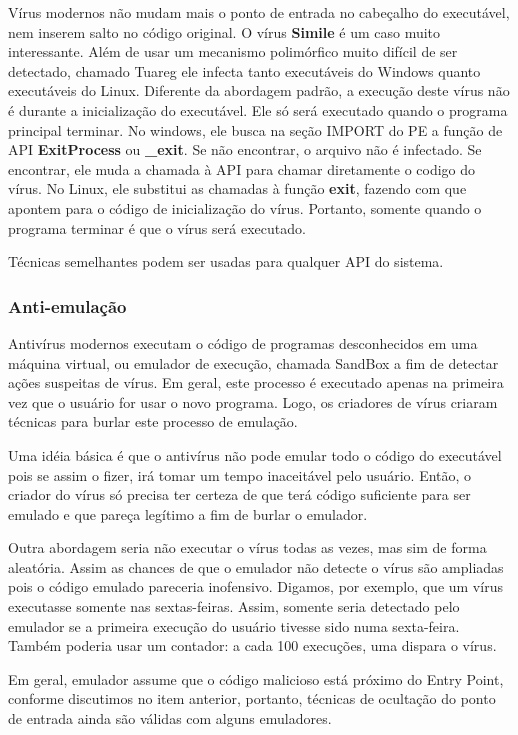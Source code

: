 Vírus modernos não mudam mais o ponto de entrada no cabeçalho do executável, nem inserem salto no código original. O vírus \textbf{Simile}\cite{symantec:2} é um caso muito interessante. Além de usar um mecanismo polimórfico muito difícil de ser detectado, chamado Tuareg\cite{szor:2} ele infecta tanto executáveis do Windows quanto executáveis do Linux. Diferente da abordagem padrão, a execução deste vírus não é durante a inicialização do executável. Ele só será executado quando o programa principal terminar. No windows, ele busca na seção IMPORT do PE a função de API \textbf{ExitProcess} ou \textbf{\_exit}. Se não encontrar, o arquivo não é infectado. Se encontrar, ele muda a chamada à API para chamar diretamente o codigo do vírus. No Linux, ele substitui as chamadas à função \textbf{exit}, fazendo com que apontem para o código de inicialização do vírus. Portanto, somente quando o programa terminar é que o vírus será executado.

Técnicas semelhantes podem ser usadas para qualquer API do sistema.

\subsubsection{Anti-emulação}
Antivírus modernos executam o código de programas desconhecidos em uma máquina virtual, ou emulador de execução, chamada SandBox a fim de detectar ações suspeitas de vírus. Em geral, este processo é executado apenas na primeira vez que o usuário for usar o novo programa. Logo, os criadores de vírus criaram técnicas para burlar este processo de emulação.

Uma idéia básica é que o antivírus não pode emular todo o código do executável pois se assim o fizer, irá tomar um tempo inaceitável pelo usuário. Então, o criador do vírus só precisa ter certeza de que terá código suficiente para ser emulado e que pareça legítimo a fim de burlar o emulador.

Outra abordagem seria não executar o vírus todas as vezes, mas sim de forma aleatória. Assim as chances de que o emulador não detecte o vírus são ampliadas pois o código emulado pareceria inofensivo. Digamos, por exemplo, que um vírus executasse somente nas sextas-feiras. Assim, somente seria detectado pelo emulador se a  primeira execução do usuário tivesse sido numa sexta-feira. Também poderia usar um contador: a cada 100 execuções, uma dispara o vírus.

Em geral, emulador assume que o código malicioso está próximo do Entry Point, conforme discutimos no item anterior, portanto, técnicas de ocultação do ponto de entrada ainda são válidas com alguns emuladores.

